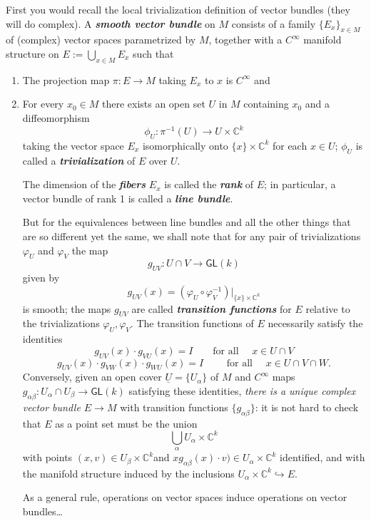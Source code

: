 First you would recall the local trivialization definition of vector bundles (they will do complex). A \textit{\textbf{smooth vector bundle}} on \(M\) consists of a family \(\{E_{x}\}_{x \in M}\) of (complex) vector spaces parametrized by \(M\), together with a \(C^\infty\) manifold structure on \(E:= \bigcup_{x \in M}E_x\) such that
\begin{enumerate}
\item The projection map \(\pi:E \to M\) taking \(E_x\) to \(x\) is \(C^\infty\) and
\item For every \(x_0 \in M\) there exists an open set \(U\) in \(M\) containing \(x_0\) and a diffeomorphism
	\[\phi_U:\pi^{-1}(U)\longrightarrow U\times \mathbb{C}^k\]
taking the vector space \(E_x\) isomorphically onto \(\{x \}\times \mathbb{C}^k\) for each \(x \in U\); \(\phi_U\) is called a \textit{\textbf{trivialization}} of \(E\) over \(U\).

The dimension of the \textit{\textbf{fibers}} \(E_x\) is called the \textit{\textbf{rank}} of \(E\); in particular, a vector bundle of rank 1 is called a \textit{\textbf{line bundle}}.

But for the equivalences between line bundles and all the other things that are so different yet the same, we shall note that for any pair of trivializations \(\varphi_U\) and \(\varphi_V\) the map
\[g_{UV}:U \cap V \to \mathsf{GL}(k)\]
given by
\[g_{UV}(x)=(\varphi_U \circ \varphi_V^{-1})|_{\{x\}\times \mathbb{C}^k}\]
is smooth; the maps \(g_{UV}\) are called \textit{\textbf{transition functions}} for \(E\) relative to the trivializations \(\varphi_U, \varphi_V\). The transition functions of \(E\) necessarily satisfy the identities
\[g_{UV}(x)\cdot g_{VU}(x)=I\qquad \text{for all } \quad  x \in U \cap V\]
\[g_{UV}(x) \cdot g_{VW}(x) \cdot g_{WU}(x)=I\qquad \text{ for all } \quad  x \in U \cap V \cap W.\]
Conversely, given an open cover \(\underline{U}=\{U_\alpha\}\) of \(M\) and \(C^\infty\) maps \(g_{\alpha \beta}:U_\alpha \cap U_\beta \to \mathsf{GL}(k)\) satisfying these identities, \textit{there is a unique complex vector bundle \(E \to M\)} with transition functions \(\{g_{\alpha\beta}\}\): it is not hard to check that \(E\) as a point set must be the union
\[\bigcup_{\alpha}U_{\alpha}\times \mathbb{C}^k\]
with points  \((x,v) \in U_\beta \times \mathbb{C}^k\)and \(x g_{\alpha \beta}(x)\cdot v) \in U_\alpha \times \mathbb{C}^k\) identified, and with the manifold structure induced by the inclusions \(U_\alpha \times \mathbb{C}^k \hookrightarrow  E\).

As a general rule, operations on vector spaces induce operations on vector bundles… 


\end{enumerate}
